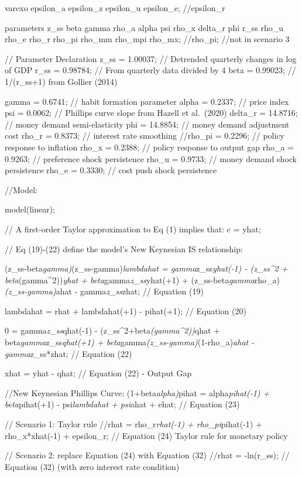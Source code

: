 \documentclass[11pt,preprint, authoryear]{elsarticle}
\numberwithin{equation}{section}
\numberwithin{figure}{section}
\numberwithin{table}{section}
\begin{document}
varexo epsilon\_a epsilon\_z epsilon\_u epsilon\_e; //epsilon\_r

parameters z\_ss beta gamma rho\_a alpha psi rho\_x delta\_r phi r\_ss
rho\_u rho\_e rho\_r rho\_pi rho\_mm rho\_mpi rho\_mx; //rho\_pi; //not
in scenario 3

// Parameter Declaration z\_ss = 1.00037; // Detrended quarterly changes
in log of GDP r\_ss = 0.98784; // From quarterly data divided by 4 beta
= 0.99023; // 1/(r\_ss+1) from Gollier (2014)

gamma = 0.6741; // habit formation parameter alpha = 0.2337; // price
index psi = 0.0062; // Phillips curve slope from Hazell et al.~(2020)
delta\_r = 14.8716; // money demand semi-elasticity phi = 14.8854; //
money demand adjustment cost rho\_r = 0.8373; // interest rate smoothing
//rho\_pi = 0.2296; // policy response to inflation rho\_x = 0.2388; //
policy response to output gap rho\_a = 0.9263; // preference shock
persistence rho\_u = 0.9733; // money demand shock persistence rho\_e =
0.3330; // cost push shock persistence

//Model:

model(linear);

// A first-order Taylor approximation to Eq (1) implies that: c = yhat;

// Eq (19)-(22) define the model's New Keynesian IS relationship:

(z\_ss-beta\emph{gamma)}(z\_ss-gamma)\emph{lambdahat =
gamma}z\_ss\emph{yhat(-1) - (z\_ss\^{}2 + beta}(gamma\^{}2))\emph{yhat +
beta}gamma\emph{z\_ss}yhat(+1) +
(z\_ss-beta\emph{gamma}rho\_a)\emph{(z\_ss-gamma)}ahat -
gamma\emph{z\_ss}zhat; // Equation (19)

lambdahat = rhat + lambdahat(+1) - pihat(+1); // Equation (20)

0 = gamma\emph{z\_ss}qhat(-1) - (z\_ss\^{}2+beta\emph{(gamma\^{}2))}qhat
+ beta\emph{gamma}z\_ss\emph{qhat(+1) +
beta}gamma\emph{(z\_ss-gamma)}(1-rho\_a)\emph{ahat - gamma}z\_ss*zhat;
// Equation (22)

xhat = yhat - qhat; // Equation (22) - Output Gap

//New Keynesian Phillips Curve: (1+beta\emph{alpha)}pihat =
alpha\emph{pihat(-1) + beta}pihat(+1) - psi\emph{lambdahat + psi}ahat +
ehat; // Equation (23)

// Scenario 1: Taylor rule //rhat = rho\_r\emph{rhat(-1) +
rho\_pi}pihat(-1) + rho\_x*xhat(-1) + epsilon\_r; // Equation (24)
Taylor rule for monetary policy

// Scenario 2: replace Equation (24) with Equation (32) //rhat =
-ln(r\_ss); // Equation (32) (with zero interest rate condition)
\end{document}
